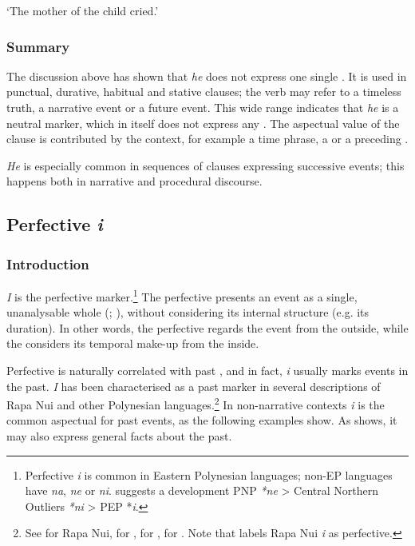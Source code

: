 \glt 
‘The mother of the child cried.’ \textstyleExampleref{[R338.008]} 
\z

\subsubsection[Summary]{Summary}\label{sec:7.2.3.4}

The discussion above has shown that \textit{he} does not express one single . It is used in punctual, durative, habitual and stative clauses; the verb may refer to a timeless truth, a narrative event or a future event. This wide range indicates that \textit{he} is a neutral  marker, which in itself does not express any . The aspectual value of the clause is contributed by the context, for example a time phrase, a  or a preceding .

\textit{He} is especially common in sequences of clauses expressing successive events; this happens both in narrative and procedural discourse.
\subsection{Perfective \textit{i}}\label{sec:7.2.4}
\subsubsection[Introduction]{Introduction}\label{sec:7.2.4.1}

\textit{I} is the perfective marker.\footnote{\label{fn:319}Perfective \textit{i} is common in Eastern Polynesian languages; non-EP languages have \textit{na}, \textit{ne} or \textit{ni}. \citet[314]{Wilson2012} suggests a development PNP \textit{*ne} {\textgreater} Central Northern Outliers \textit{*ni} {\textgreater} PEP *\textit{i}.} The perfective  presents an event as a single, unanalysable whole (\citealt[3]{Comrie1976}; \citealt[35]{Dixon2012}), without considering its internal structure (e.g. its duration). In other words, the perfective regards the event from the outside, while the  considers its temporal make-up from the inside.

Perfective  is naturally correlated with past  \citep[72]{Comrie1976}, and in fact, \textit{i} usually marks events in the past. \textit{I} has been characterised as a past  marker in several descriptions of Rapa Nui and other Polynesian languages.\footnote{\label{fn:320}See \citet[156]{DuFeu1996} for Rapa Nui, \citet{MutuTeìkitutoua2002} for , \citet[172]{AcadémieTahitienne1986} for , \citet[34]{Biggs1973} for . Note that \citet[153]{Chapin1978} labels Rapa Nui \textit{i} as perfective.} In non-narrative contexts \textit{i} is the common aspectual for past events, as the following examples show. As  shows, it may also express general facts about the past.

